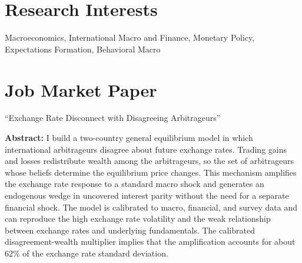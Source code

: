 \documentclass[letterpaper,11pt]{article}
\newenvironment{cvsection}{%
  \begin{list}{}{\setlength{\leftmargin}{0.15in}%
    \setlength{\rightmargin}{0.10in}%
    \setlength{\topsep}{0pt}\setlength{\partopsep}{0pt}%
    \setlength{\itemsep}{0pt}\setlength{\parsep}{0pt}}\item[]
}{\end{list}}
\newenvironment{projectdetails}{%
  \begin{list}{}{\setlength{\leftmargin}{0.15in}%
    \setlength{\rightmargin}{0pt}\setlength{\topsep}{3pt}%
    \setlength{\partopsep}{0pt}\setlength{\parsep}{0pt}}\item[]\small
}{\end{list}}
\begin{document}
\section*{Research Interests}
\begin{cvsection}
Macroeconomics, International Macro and Finance,
    Monetary Policy, Expectations Formation, Behavioral Macro
\end{cvsection}  

\section*{Job Market Paper}
\begin{cvsection}
  ``Exchange Rate Disconnect with Disagreeing Arbitrageurs''
  \begin{projectdetails}
    \textbf{Abstract:} I build a two-country general equilibrium model in which international arbitrageurs disagree about future exchange rates. Trading gains and losses redistribute wealth among the arbitrageurs, so the set of arbitrageurs whose beliefs determine the equilibrium price changes. This mechanism amplifies the exchange rate response to a standard macro shock and generates an endogenous wedge in uncovered interest parity without the need for a separate financial shock. The model is calibrated to macro, financial, and survey data and can reproduce the high exchange rate volatility and the weak relationship between exchange rates and underlying fundamentals. The calibrated disagreement-wealth multiplier implies that the amplification accounts for about 62\% of the exchange rate standard deviation.  
\end{projectdetails}
\end{cvsection}
\end{document}
